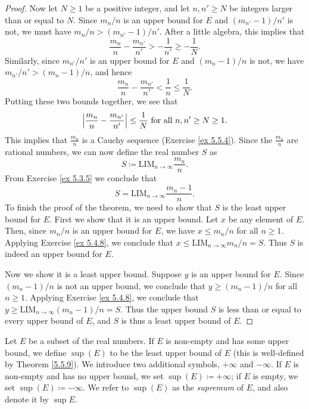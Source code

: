 \begin{proof}
    Now let \(N \geq 1\) be a positive integer, and let \(n, n' \geq N\) be integers larger than or equal to \(N\).
    Since \(m_n / n\) is an upper bound for \(E\) and \((m_{n'} - 1) / n'\) is not, we must have \(m_n / n > (m_{n'} - 1) / n'\).
    After a little algebra, this implies that
    \[
        \frac{m_n}{n} - \frac{m_{n'}}{n'} > -\frac{1}{n'} \geq -\frac{1}{N}.
    \]
    Similarly, since \(m_{n'} / n'\) is an upper bound for \(E\) and \((m_n - 1) / n\) is not, we have \(m_{n'} / n' > (m_n - 1) / n\), and hence
    \[
        \frac{m_n}{n} - \frac{m_{n'}}{n'} < \frac{1}{n} \leq \frac{1}{N}.
    \]
    Putting these two bounds together, we see that
    \[
        \abs*{\frac{m_n}{n} - \frac{m_{n'}}{n'}} \leq \frac{1}{N} \text{ for all } n, n' \geq N \geq 1.
    \]
    This implies that \(\frac{m_n}{n}\) is a Cauchy sequence (Exercise \ref{ex 5.5.4}).
    Since the \(\frac{m_n}{n}\) are rational numbers, we can now define the real number \(S\) as
    \[
        S \coloneqq \text{LIM}_{n \to \infty} \frac{m_n}{n}.
    \]
    From Exercise \ref{ex 5.3.5} we conclude that
    \[
        S = \text{LIM}_{n \to \infty} \frac{m_n - 1}{n}.
    \]
    To finish the proof of the theorem, we need to show that \(S\) is the least upper bound for \(E\).
    First we show that it is an upper bound.
    Let \(x\) be any element of \(E\).
    Then, since \(m_n / n\) is an upper bound for \(E\), we have \(x \leq m_n / n\) for all \(n \geq 1\).
    Applying Exercise \ref{ex 5.4.8}, we conclude that \(x \leq \text{LIM}_{n \to \infty} m_n / n = S\).
    Thus \(S\) is indeed an upper bound for \(E\).

    Now we show it is a least upper bound.
    Suppose \(y\) is an upper bound for \(E\).
    Since \((m_n - 1) / n\) is not an upper bound, we conclude that \(y \geq (m_n - 1) / n\) for all \(n \geq 1\).
    Applying Exercise \ref{ex 5.4.8}, we conclude that \(y \geq \text{LIM}_{n \to \infty} (m_n - 1) / n = S\).
    Thus the upper bound \(S\) is less than or equal to every upper bound of \(E\), and \(S\) is thus a least upper bound of \(E\).
\end{proof}

\begin{definition}[Supremum]\label{5.5.10}
    Let \(E\) be a subset of the real numbers.
    If \(E\) is non-empty and has some upper bound, we define \(\sup(E)\) to be the least upper bound of \(E\)
    (this is well-defined by Theorem \ref{5.5.9}).
    We introduce two additional symbols, \(+\infty\) and \(-\infty\).
    If \(E\) is non-empty and has no upper bound, we set \(\sup(E) \coloneqq +\infty\);
    if \(E\) is empty, we set \(\sup(E) \coloneqq -\infty\).
    We refer to \(\sup(E)\) as the \emph{supremum} of \(E\), and also denote it by \(\sup E\).
\end{definition}

